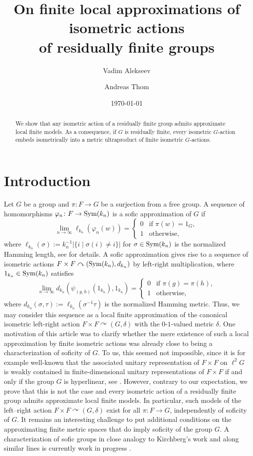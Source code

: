 \documentclass[11pt,a4paper]{amsproc}
\title[Finite local approximations of isometric actions]{On finite local approximations of isometric actions \\ of residually finite groups}
\author{Vadim Alekseev}
\author{Andreas Thom}
\date{\today}
\numberwithin{equation}{section}
\theoremstyle{definition}
\begin{document}
\begin{abstract}
We show that any isometric action of a residually finite group admits approximate local finite models. As a consequence, if $G$ is residually finite, every isometric $G$-action embeds isometrically into a metric ultraproduct of finite isometric $G$-actions.
\end{abstract}

\maketitle

\section{Introduction}

Let $G$ be a group and $\pi \colon F \to G$ be a surjection from a free group. A sequence of homomorphisms $\varphi_n \colon F \to {\rm Sym}(k_n)$ is a sofic approximation of $G$ if 
\[
\lim_{n \to \infty} \ell_{k_n}(\varphi_n(w))  =
\begin{cases}
0 &\text{if } \pi(w)=1_{G},\\
1 &\text{otherwise,}
\end{cases}
\]
where $\ell_{k_n}(\sigma):=k_n^{-1} |\{i \mid \sigma(i) \neq i\}|$ for $\sigma \in {\rm Sym}(k_n)$ is the normalized Hamming length, see \cite{PestovBriefGuide} for details. A sofic approximation gives rise to a sequence of isometric actions $F \times F \curvearrowright ({\rm Sym}(k_n),d_{k_n})$ by left-right multiplication, where $1_{k_n} \in {\rm Sym}(k_n)$ satisfies
\[
\lim_{n \to \infty} d_{k_n}(\psi_{(g,h)}(1_{k_n}),1_{k_n})  =
\begin{cases}
0 &\text{if } \pi(g)= \pi(h),\\
1 &\text{otherwise,}
\end{cases}
\]
where $d_{k_n}(\sigma,\tau):=\ell_{k_n}(\sigma^{-1}\tau)$ is the normalized Hamming metric. Thus, we may consider this sequence as a local finite approximation of the canonical isometric left-right action $F \times F \curvearrowright (G,\delta)$ with the $0$-$1$-valued metric $\delta.$ One motivation of this article was to clarify whether the mere existence of such a local approximation by finite isometric actions was already close to being a characterization of soficity of $G.$ To us, this seemed not impossible, since it is for example well-known that the associated unitary representation of $F \times F$ on $\ell^2 G$ is weakly contained in finite-dimensional unitary representations of $F \times F$ if and only if the group $G$ is hyperlinear, see \cite[Theorem 6.2.7, Exercise 6.2.4]{BrownOzawa}.
However, contrary to our expectation, we prove that this is not the case and every isometric action of a residually finite group admits approximate local finite models. 
In particular, such models of the left–right action $F \times F \curvearrowright (G,\delta)$ exist for all $\pi \colon F \to G$, independently of soficity of $G$. It remains an interesting challenge to put additional conditions on the approximating finite metric spaces that do imply soficity of the group $G$. A characterization of sofic groups in close analogy to Kirchberg's work and along similar lines is currently work in progress \cite{alekthom}.
\end{document}
